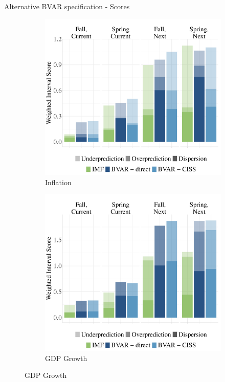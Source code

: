 \documentclass[en]{sdqbeamer}
\begin{document}
\begin{frame}{Alternative BVAR specification - Scores}
\label{alternativebvar}
\begin{figure}
  \begin{subfigure}{0.45\textwidth}
  \centering
    \includegraphics[width=\textwidth]{figures/ho_bvarspecs_wis_pcpi_pch_absolute_rollingwindow.pdf} %
    \caption{Inflation}
  \end{subfigure}
  \hspace*{8mm}
  \begin{subfigure}{0.45\textwidth}
  \centering
    \includegraphics[width=\textwidth]{figures/ho_bvarspecs_wis_ngdp_rpch_absolute_rollingwindow.pdf} %
    \caption{GDP Growth}
  \end{subfigure}%
\end{figure}
\end{frame}
\end{document}

